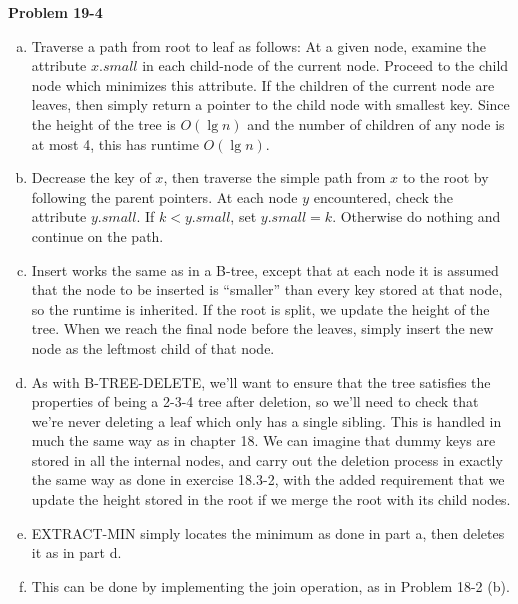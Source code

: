 \documentclass{article}
\begin{document}
\noindent\textbf{Problem 19-4}\\
\begin{enumerate}[a.]
\item Traverse a path from root to leaf as follows: At a given node, examine the attribute $x.small$ in each child-node of the current node. Proceed to the child node which minimizes this attribute. If the children of the current node are leaves, then simply return a pointer to the child node with smallest key.  Since the height of the tree is $O(\lg n)$ and the number of children of any node is at most 4, this has runtime $O(\lg n)$. \\

\item Decrease the key of $x$, then traverse the simple path from $x$ to the root by following the parent pointers.  At each node $y$ encountered, check the attribute $y.small$.  If $k < y.small$, set $y.small = k$.  Otherwise do nothing and continue on the path. \\

\item Insert works the same as in a B-tree, except that at each node it is assumed that the node to be inserted is ``smaller'' than every key stored at that node, so the runtime is inherited.  If the root is split, we update the height of the tree. When we reach the final node before the leaves, simply insert the new node as the leftmost child of that node. \\

\item As with B-TREE-DELETE, we'll want to ensure that the tree satisfies the properties of being a 2-3-4 tree after deletion, so we'll need to check that we're never deleting a leaf which only has a single sibling.  This is handled in much the same way as in chapter 18.  We can imagine that dummy keys are stored in all the internal nodes, and carry out the deletion process in exactly the same way as done in exercise 18.3-2, with the added requirement that we update the height stored in the root if we merge the root with its child nodes. \\

\item EXTRACT-MIN simply locates the minimum as done in part a, then deletes it as in part d. \\

\item This can be done by implementing the join operation, as in Problem 18-2 (b). \\
\end{enumerate}
\end{document}
